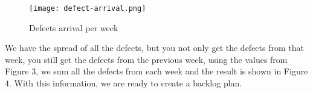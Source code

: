 \pagebreak

\begin{figure}[!htb]
    \centering
    \texttt{[image: defect-arrival.png]}    
    \caption{Defects arrival per week}
\end{figure}
\noindent
We have the spread of all the defects, but you not only get the defects from 
that week, you still get the defects from the previous week, using the values 
from Figure 3, we sum all the defects from each week and the result is 
shown in Figure 4. With this information, we are ready to create a backlog 
plan.